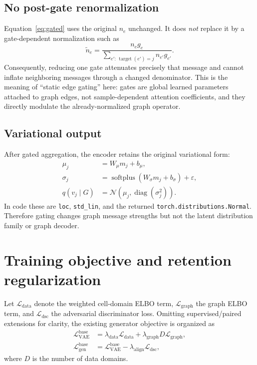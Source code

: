 \documentclass[11pt]{article}
\newcommand{\code}[1]{\texttt{#1}}
\begin{document}
\subsection{No post-gate renormalization}

Equation~\eqref{eq:gated} uses the original $n_e$ unchanged.  It does
\emph{not} replace it by a gate-dependent normalization such as
\begin{equation*}
  \widetilde n_e = \frac{n_e g_e}{\sum_{e':\,\operatorname{target}(e')=j}n_{e'}g_{e'}}.
\end{equation*}
Consequently, reducing one gate attenuates precisely that message and cannot
inflate neighboring messages through a changed denominator.  This is the
meaning of ``static edge gating'' here: gates are global learned parameters
attached to graph edges, not sample-dependent attention coefficients, and they
directly modulate the already-normalized graph operator.

\subsection{Variational output}

After gated aggregation, the encoder retains the original variational form:
\begin{align}
  \mu_j &= W_\mu m_j+b_\mu,\\
  \sigma_j &= \operatorname{softplus}(W_\sigma m_j+b_\sigma)+\varepsilon,\\
  q(v_j\mid G)&=\mathcal{N}(\mu_j,\operatorname{diag}(\sigma_j^2)).
\end{align}
In code these are \code{loc}, \code{std\_lin}, and the returned
\code{torch.distributions.Normal}.  Therefore gating changes graph message
strengths but not the latent distribution family or graph decoder.

\section{Training objective and retention regularization}

Let $\mathcal L_{\mathrm{data}}$ denote the weighted cell-domain ELBO term,
$\mathcal L_{\mathrm{graph}}$ the graph ELBO term, and
$\mathcal L_{\mathrm{dsc}}$ the adversarial discriminator loss.  Omitting
supervised/paired extensions for clarity, the existing generator objective is
organized as
\begin{align}
  \mathcal L_{\mathrm{VAE}}^{\mathrm{base}}
    &=\lambda_{\mathrm{data}}\mathcal L_{\mathrm{data}}
      +\lambda_{\mathrm{graph}}D\mathcal L_{\mathrm{graph}},\\
  \mathcal L_{\mathrm{gen}}^{\mathrm{base}}
    &=\mathcal L_{\mathrm{VAE}}^{\mathrm{base}}
      -\lambda_{\mathrm{align}}\mathcal L_{\mathrm{dsc}},
\end{align}
where $D$ is the number of data domains.
\end{document}
